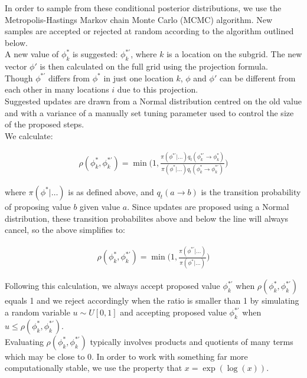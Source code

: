 \documentclass{article}
\begin{document}
In order to sample from these conditional posterior distributions, we use the Metropolis-Hastings Markov chain Monte Carlo (MCMC) algorithm. New samples are accepted or rejected at random according to the algorithm outlined below. \\

A new value of $\phi^*_k$ is suggested: $\phi^{*'}_k$, where $k$ is a location on the subgrid. The new vector $\phi'$ is then calculated on the full grid using the projection formula. \\

Though $\phi^{*'}$ differs from $\phi^*$ in just one location $k$, $\phi$ and $\phi'$ can be different from each other in many locations $i$ due to this projection. \\

Suggested updates are drawn from a Normal distribution centred on the old value and with a variance of a manually set tuning parameter used to control the size of the proposed steps. \\

We calculate:

\begin{align*}
\rho(\phi^*_k, \phi^{*'}_k) = \min \bigg (1, \frac{\pi(\phi^{*'} | \dots ) q_t(\phi^{*'}_k \to \phi^*_k)}{ \pi(\phi^* | \dots ) q_t(\phi^{*}_k \to \phi^{*'}_k) } \bigg)
\end{align*}

where $\pi(\phi^* | \dots)$ is as defined above, and $q_t(a \to b)$ is the transition probability of proposing value $b$ given value $a$. Since updates are proposed using a Normal distribution, these transition probabilites above and below the line will always cancel, so the above simplifies to:

\begin{align*}
\rho(\phi^*_k, \phi^{*'}_k) = \min \bigg (1, \frac{\pi(\phi^{*'} | \dots ) }{ \pi(\phi^* | \dots ) } \bigg)
\end{align*}

Following this calculation, we always accept proposed value $\phi^{*'}_k$ when $\rho(\phi^*_k, \phi^{*'}_k)$ equals 1 and we reject accordingly when the ratio is smaller than 1 by simulating a random variable $u \sim U[0, 1]$ and accepting proposed value $\phi^{*'}_k$ when $u\leq \rho(\phi^*_k, \phi^{*'}_k)$. \\

Evaluating $\rho(\phi^*_k, \phi^{*'}_k)$ typically involves products and quotients of many terms which may be close to 0. In order to work with something far more computationally stable, we use the property that $x = \exp(\log(x))$. \\ 
\end{document}
